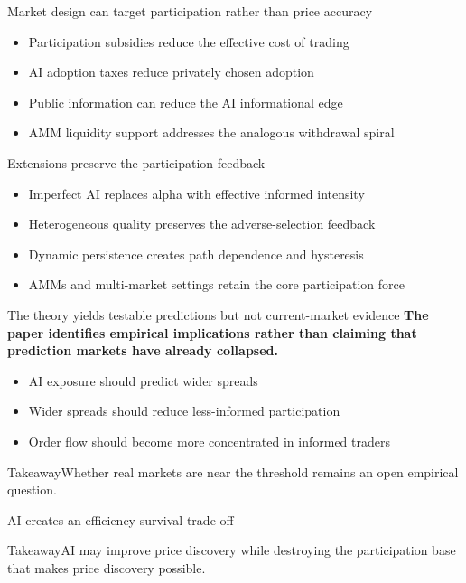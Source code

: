 \documentclass[10pt]{mycool}
\begin{document}
\begin{frame}{Market design can target participation rather than price accuracy}
\begin{itemize}
  \item Participation subsidies reduce the effective cost of trading
  \item AI adoption taxes reduce privately chosen adoption
  \item Public information can reduce the AI informational edge
  \item AMM liquidity support addresses the analogous withdrawal spiral
\end{itemize}
\end{frame}

\begin{frame}{Extensions preserve the participation feedback}
\begin{itemize}
  \item Imperfect AI replaces alpha with effective informed intensity
  \item Heterogeneous quality preserves the adverse-selection feedback
  \item Dynamic persistence creates path dependence and hysteresis
  \item AMMs and multi-market settings retain the core participation force
\end{itemize}
\end{frame}

\begin{frame}{The theory yields testable predictions but not current-market evidence}
\textbf{The paper identifies empirical implications rather than claiming that prediction markets have already collapsed.}
\begin{itemize}
  \item AI exposure should predict wider spreads
  \item Wider spreads should reduce less-informed participation
  \item Order flow should become more concentrated in informed traders
\end{itemize}
\begin{block}{Takeaway}Whether real markets are near the threshold remains an open empirical question.\end{block}
\end{frame}

\begin{frame}{AI creates an efficiency-survival trade-off}
\vfill
\begin{block}{Takeaway}AI may improve price discovery while destroying the participation base that makes price discovery possible.\end{block}
\vfill
\end{frame}
\end{document}
